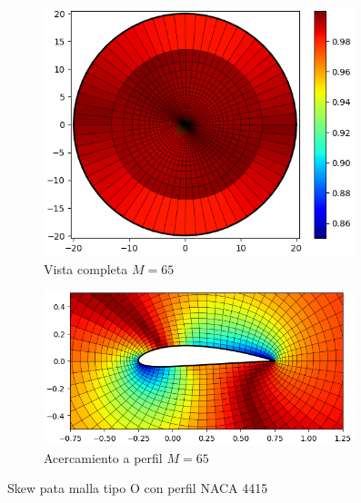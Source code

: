 \documentclass[letterpaper, openright, 12pt]{book}
\begin{document}
\begin{figure}[htbp!]
\begin{subfigure}[c]{0.48\textwidth}
            \includegraphics[keepaspectratio,
                width=0.99\textwidth]{./img/naca4415_m_65_skew_far}
            \caption{Vista completa $M=65$}
            \label{fig:naca4415_m_65_skew_far}
        \end{subfigure}
        \hfill
        \begin{subfigure}[c]{0.48\textwidth}
            \includegraphics[keepaspectratio,
                width=0.99\textwidth]{./img/naca4415_m_65_skew_close}
            \caption{Acercamiento a perfil $M=65$}
            \label{fig:naca4415_m_65_skew_close}
        \end{subfigure}
        \caption{Skew pata malla tipo O con perfil NACA 4415}
        \label{fig:naca4415_skew_0}
    \end{figure}
\end{document}
